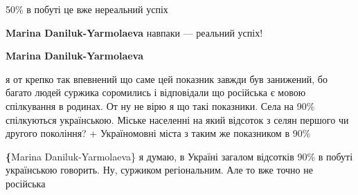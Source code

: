  
 
 
 
 

\begin{itemize}{
 

50\% в побуті це вже нереальний успіх

\begin{itemize}{
 
\textbf{Marina Daniluk-Yarmolaeva} навпаки — реальний успіх!

 
\textbf{Marina Daniluk-Yarmolaeva} 

я от крепко так впевнений що саме цей
показник завжди був занижений, бо багато людей суржика соромились і відповідали
що російська є мовою спілкування в родинах. От ну не вірю я що такі показники.
Села на 90\% спілкуються українською. Міське населенні на який відсоток з селян
першого чи другого покоління? + Україномовні міста з таким же показником в 90\%

 
\textbf\{Marina Daniluk-Yarmolaeva\} я думаю, в Україні загалом відсотків 90\% в
побуті українською говорить. Ну, суржиком регіональним. Але то вже точно не
російська

}
\end{itemize}}
\end{itemize}

